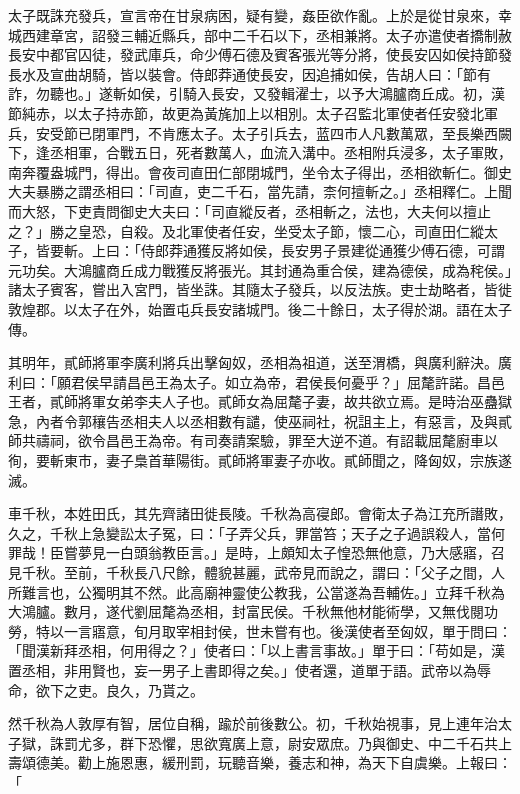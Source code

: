 \begin{pinyinscope}
太子既誅充發兵，宣言帝在甘泉病困，疑有變，姦臣欲作亂。上於是從甘泉來，幸城西建章宮，詔發三輔近縣兵，部中二千石以下，丞相兼將。太子亦遣使者撟制赦長安中都官囚徒，發武庫兵，命少傅石德及賓客張光等分將，使長安囚如侯持節發長水及宣曲胡騎，皆以裝會。侍郎莽通使長安，因追捕如侯，告胡人曰：「節有詐，勿聽也。」遂斬如侯，引騎入長安，又發輯濯士，以予大鴻臚商丘成。初，漢節純赤，以太子持赤節，故更為黃旄加上以相別。太子召監北軍使者任安發北軍兵，安受節已閉軍門，不肯應太子。太子引兵去，蓝四市人凡數萬眾，至長樂西闕下，逢丞相軍，合戰五日，死者數萬人，血流入溝中。丞相附兵浸多，太子軍敗，南奔覆盎城門，得出。會夜司直田仁部閉城門，坐令太子得出，丞相欲斬仁。御史大夫暴勝之謂丞相曰：「司直，吏二千石，當先請，柰何擅斬之。」丞相釋仁。上聞而大怒，下吏責問御史大夫曰：「司直縱反者，丞相斬之，法也，大夫何以擅止之？」勝之皇恐，自殺。及北軍使者任安，坐受太子節，懷二心，司直田仁縱太子，皆要斬。上曰：「侍郎莽通獲反將如侯，長安男子景建從通獲少傅石德，可謂元功矣。大鴻臚商丘成力戰獲反將張光。其封通為重合侯，建為德侯，成為秺侯。」諸太子賓客，嘗出入宮門，皆坐誅。其隨太子發兵，以反法族。吏士劫略者，皆徙敦煌郡。以太子在外，始置屯兵長安諸城門。後二十餘日，太子得於湖。語在太子傳。

其明年，貳師將軍李廣利將兵出擊匈奴，丞相為祖道，送至渭橋，與廣利辭決。廣利曰：「願君侯早請昌邑王為太子。如立為帝，君侯長何憂乎？」屈氂許諾。昌邑王者，貳師將軍女弟李夫人子也。貳師女為屈氂子妻，故共欲立焉。是時治巫蠱獄急，內者令郭穰告丞相夫人以丞相數有譴，使巫祠社，祝詛主上，有惡言，及與貳師共禱祠，欲令昌邑王為帝。有司奏請案驗，罪至大逆不道。有詔載屈氂廚車以徇，要斬東市，妻子梟首華陽街。貳師將軍妻子亦收。貳師聞之，降匈奴，宗族遂滅。

車千秋，本姓田氏，其先齊諸田徙長陵。千秋為高寑郎。會衛太子為江充所譖敗，久之，千秋上急變訟太子冤，曰：「子弄父兵，罪當笞；天子之子過誤殺人，當何罪哉！臣嘗夢見一白頭翁教臣言。」是時，上頗知太子惶恐無他意，乃大感寤，召見千秋。至前，千秋長八尺餘，體貌甚麗，武帝見而說之，謂曰：「父子之間，人所難言也，公獨明其不然。此高廟神靈使公教我，公當遂為吾輔佐。」立拜千秋為大鴻臚。數月，遂代劉屈氂為丞相，封富民侯。千秋無他材能術學，又無伐閱功勞，特以一言寤意，旬月取宰相封侯，世未嘗有也。後漢使者至匈奴，單于問曰：「聞漢新拜丞相，何用得之？」使者曰：「以上書言事故。」單于曰：「苟如是，漢置丞相，非用賢也，妄一男子上書即得之矣。」使者還，道單于語。武帝以為辱命，欲下之吏。良久，乃貰之。

然千秋為人敦厚有智，居位自稱，踰於前後數公。初，千秋始視事，見上連年治太子獄，誅罰尤多，群下恐懼，思欲寬廣上意，尉安眾庶。乃與御史、中二千石共上壽頌德美。勸上施恩惠，緩刑罰，玩聽音樂，養志和神，為天下自虞樂。上報曰：「


\end{pinyinscope}
